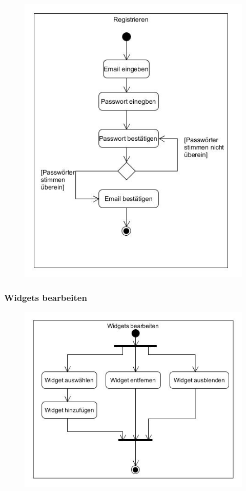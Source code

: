			\begin{figure}[H]
				\includegraphics[scale=0.6]{images/UC2Activity}
			\end{figure}
		
		\subsubsection{Widgets bearbeiten}
		
			\begin{figure}[H]
				\includegraphics[scale=0.6]{images/UC4Activity}
			\end{figure}
		
